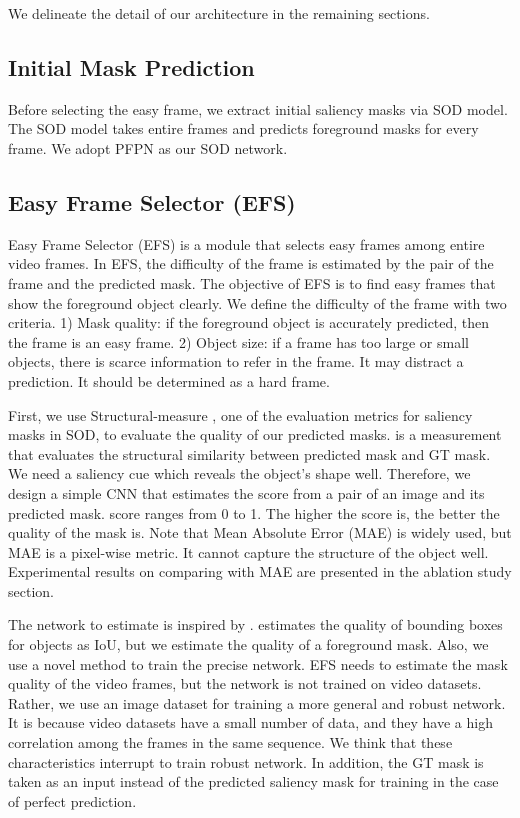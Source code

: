 \documentclass[letterpaper]{article} \usepackage{aaai22}  \usepackage{times}  \usepackage{helvet}  \usepackage{courier}  \usepackage[hyphens]{url}  \usepackage{graphicx} \urlstyle{rm} \def\UrlFont{\rm}  \usepackage{natbib}  \usepackage{caption} \DeclareCaptionStyle{ruled}{labelfont=normalfont,labelsep=colon,strut=off} \frenchspacing  \setlength{\pdfpagewidth}{8.5in}  \setlength{\pdfpageheight}{11in}  \usepackage{algorithm}
\begin{document}
We delineate the detail of our architecture in the remaining sections. 

\subsection{Initial Mask Prediction}

Before selecting the easy frame, we extract initial saliency masks via SOD model.
The SOD model takes entire frames and predicts foreground masks for every frame.
We adopt PFPN \citep{wang2020progressive} as our SOD network.

\subsection{Easy Frame Selector (EFS)}

Easy Frame Selector (EFS) is a module that selects easy frames among entire video frames. In EFS, the difficulty of the frame is estimated by the pair of the frame and the predicted mask. The objective of EFS is to find easy frames that show the foreground object clearly. We define the difficulty of the frame with two criteria. 1) Mask quality: if the foreground object is accurately predicted, then the frame is an easy frame.
2) Object size: if a frame has too large or small objects, there is scarce information to refer in the frame.  It may distract a prediction. It should be determined as a hard frame.

First, we use Structural-measure  \cite{fan2017structure}, one of the evaluation metrics for saliency masks in SOD, to evaluate the quality of our predicted masks.
 is a measurement that evaluates the structural similarity between predicted mask and GT mask. We need a saliency cue which reveals the object's shape well. Therefore, we design a simple CNN that estimates the  score from a pair of an image and its predicted mask.  score ranges from 0 to 1. The higher the  score is, the better the quality of the mask is.
Note that Mean Absolute Error (MAE) is widely used, but MAE is a pixel-wise metric. It cannot capture the structure of the object well. Experimental results on comparing  with MAE are presented in the ablation study section.

The network to estimate  is inspired by \citet{jiang2018acquisition}. \citet{jiang2018acquisition} estimates the quality of bounding boxes for objects as IoU, but we estimate the quality of a foreground mask. Also, we use a novel method to train the precise network. EFS needs to estimate the mask quality of the video frames, but the network is not trained on video datasets. Rather, we use an image dataset for training a more general and robust network. It is because video datasets have a small number of data, and they have a high correlation among the frames in the same sequence. We think that these characteristics interrupt to train robust network. In addition, the GT mask is taken as an input instead of the predicted saliency mask for training  in the case of perfect prediction.
\end{document}
